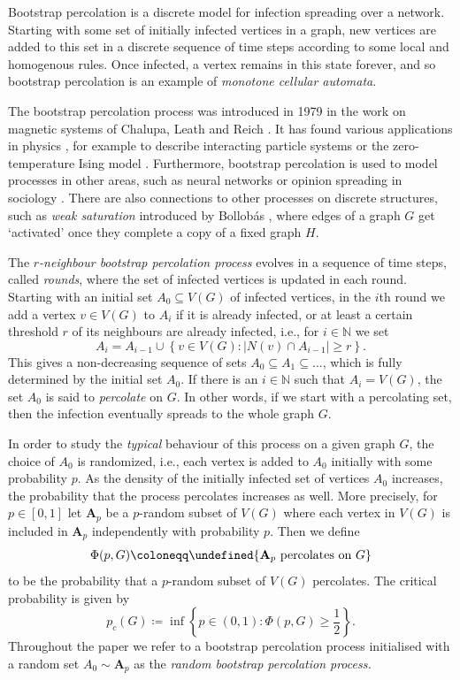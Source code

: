 \documentclass[reqno,a4paper,11pt]{amsart}
\theoremstyle{definition}
\renewcommand{\geq}{\geqslant}
\let\Pr\undefined
\begin{document}
Bootstrap percolation is a discrete model for infection spreading over a network.
Starting with some set of initially infected vertices in a graph, new vertices are added to this set in a discrete sequence of time steps according to some local and homogenous rules.
Once infected, a vertex remains in this state forever, and so bootstrap percolation is an example of \emph{monotone cellular automata}.

The bootstrap percolation process was introduced in 1979 in the work on magnetic systems of Chalupa, Leath and Reich \cite{Chalupa1979Grid}.
It has found various applications in physics \cite{Morris2017Bootstrap}, for example to describe interacting particle systems \cite{JLMTZ17} or the zero-temperature Ising model \cite{Fontes2002Ising}.
Furthermore, bootstrap percolation is used to model processes in other areas, such as neural networks \cite{Amini2010Neural} or opinion spreading in sociology \cite{Granovetter1978Sociology}.
There are also connections to other processes on discrete structures, such as \emph{weak saturation} introduced by Bollob\'as \cite{Bollobas1968Saturation}, where edges of a graph $G$ get `activated' once they complete a copy of a fixed graph $H$.

The \emph{$r$-neighbour bootstrap percolation process} evolves in a sequence of time steps, called \emph{rounds}, where the set of infected vertices is updated in each round.
Starting with an initial set $A_0 \subseteq V(G)$ of infected vertices, in the $i$th round we add a vertex $v \in V(G)$ to $A_i$ if it is already infected, or at least a certain threshold $r$ of its neighbours are already infected, i.e., for $i \in \mathbb{N}$ we set
\[
A_{i} = A_{i-1} \cup \left\{ v \in V(G) \colon \left|N(v) \cap A_{i-1}\right| \geq r \right\}.
\]
This gives a non-decreasing sequence of sets $A_0 \subseteq A_1 \subseteq \ldots$, which is fully determined by the initial set $A_0$.
If there is an $i \in \mathbb{N}$ such that $A_i=V(G)$, the set $A_0$ is said to \emph{percolate} on $G$.
In other words, if we start with a percolating set, then the infection eventually spreads to the whole graph $G$.

In order to study the \emph{typical} behaviour of this process on a given graph $G$, the choice of $A_0$ is randomized, i.e., each vertex is added to $A_0$ initially with some probability $p$.
As the density of the initially infected set of vertices $A_0$ increases, the probability that the process percolates increases as well.
More precisely, for $p \in [0,1]$ let $\textbf{A}_p$ be a $p$-random subset of $V(G)$ where each vertex in $V(G)$ is included in $\textbf{A}_p$ independently with probability $p$.
Then we define
\[
  \Phi(p,G) \coloneqq \Pr{\textbf{A}_p \text{ percolates on } G}
\]
to be the probability that a $p$-random subset of $V(G)$ percolates. The critical probability is given by
\[
p_c(G) \coloneqq \inf \left\{ p \in (0,1) \colon  \Phi(p,G) \geq \frac{1}{2} \right\}.
\]
Throughout the paper we refer to a bootstrap percolation process initialised with a random set $A_0 \sim \textbf{A}_p$ as the \emph{random bootstrap percolation process.}
\end{document}
